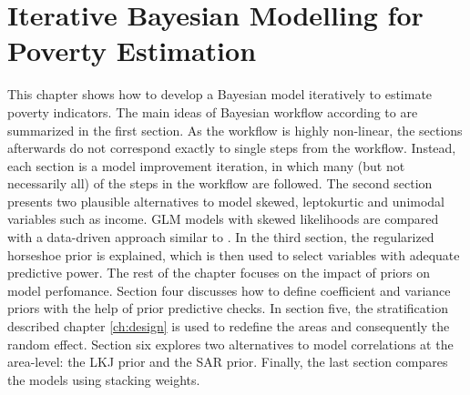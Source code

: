 \chapter{Iterative Bayesian Modelling for Poverty Estimation}

\label{ch:workflow}

This chapter shows how to develop a Bayesian model iteratively to estimate poverty indicators.
The main ideas of Bayesian workflow according to \cite{gelman_bayesian_2020} are summarized in the first section. As the workflow is highly non-linear, the sections afterwards do not correspond exactly to single steps from the workflow.
Instead, each section is a model improvement iteration, in which many (but not necessarily all) of the steps in the workflow are followed.
The second section presents two plausible alternatives to model skewed, leptokurtic and unimodal variables such as income. GLM models with skewed likelihoods are compared with a data-driven approach similar to \cite{morelli_hierarchical_2021}.
In the third section, the regularized horseshoe prior is explained, which is then used to select variables with adequate predictive power.
The rest of the chapter focuses on the impact of priors on model perfomance.
Section four discusses how to define coefficient and variance priors with the help of prior predictive checks.
In section five, the stratification described chapter \ref{ch:design} is used to redefine the areas and consequently the random effect.
Section six explores two alternatives to model correlations at the area-level: the LKJ prior and the SAR prior.
Finally, the last section compares the models using stacking weights.









